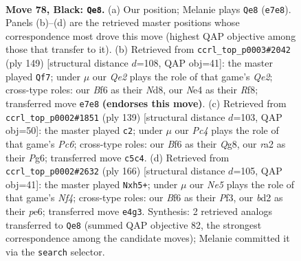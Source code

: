 \documentclass[11pt]{article}
\begin{document}
\clearpage

\begin{figure}[p]\centering
\begin{subfigure}{0.46\textwidth}\centering
\resizebox{\linewidth}{!}{%
\newchessgame
\chessboard[
  setfen={1r6/4q1k1/5b2/P1pQ1p2/3pnPp1/4P3/R2B4/3NK3 b - - 0 78},
  showmover=false,
  pgfstyle=straightmove, color=movearrow, markmove={e7-e8}
]}
\caption{}
\end{subfigure}\hfill
\begin{subfigure}{0.46\textwidth}\centering
\resizebox{\linewidth}{!}{%
\newchessgame
\chessboard[
  setfen={3n1r1k/4q3/Qp1p3P/b2PpBp1/4P1N1/8/5PK1/7R b - - 18 75},
  showmover=false,
  pgfstyle=straightmove, color=movearrow, markmove={e7-f7}
]}
\caption{}
\end{subfigure}
\\[4pt]
\begin{subfigure}{0.46\textwidth}\centering
\resizebox{\linewidth}{!}{%
\newchessgame
\chessboard[
  setfen={6q1/7k/1p4pB/p1bbQ1Pp/P3pR1P/2p3K1/8/8 b - - 1 70},
  showmover=false,
  pgfstyle=straightmove, color=movearrow, markmove={c3-c2}
]}
\caption{}
\end{subfigure}\hfill
\begin{subfigure}{0.46\textwidth}\centering
\resizebox{\linewidth}{!}{%
\newchessgame
\chessboard[
  setfen={4r3/p2b1pk1/P2qp3/7p/2pP1N1P/2P2PP1/3Q2K1/8 w - - 0 84},
  showmover=false,
  pgfstyle=straightmove, color=movearrow, markmove={f4-h5}
]}
\caption{}
\end{subfigure}
\caption{\textbf{Move 78, Black: \texttt{Qe8}.} (a) Our position; Melanie plays \texttt{Qe8} (\texttt{e7e8}). Panels (b)--(d) are the retrieved master positions whose correspondence most drove this move (highest QAP objective among those that transfer to it). (b) Retrieved from \texttt{ccrl\_top\_p0003\#2042} (ply 149) [structural distance $d$=108, QAP obj=41]: the master played \texttt{Qf7}; under $\mu$ our \emph{Qe2} plays the role of that game's \emph{Qe2}; cross-type roles: our \emph{B}f6 as their \emph{N}d8, our \emph{N}e4 as their \emph{R}f8; transferred move \texttt{e7e8} \textbf{(endorses this move)}. (c) Retrieved from \texttt{ccrl\_top\_p0002\#1851} (ply 139) [structural distance $d$=103, QAP obj=50]: the master played \texttt{c2}; under $\mu$ our \emph{Pc4} plays the role of that game's \emph{Pc6}; cross-type roles: our \emph{B}f6 as their \emph{Q}g8, our \emph{r}a2 as their \emph{P}g6; transferred move \texttt{c5c4}. (d) Retrieved from \texttt{ccrl\_top\_p0002\#2632} (ply 166) [structural distance $d$=105, QAP obj=41]: the master played \texttt{Nxh5+}; under $\mu$ our \emph{Ne5} plays the role of that game's \emph{Nf4}; cross-type roles: our \emph{B}f6 as their \emph{P}f3, our \emph{b}d2 as their \emph{p}e6; transferred move \texttt{e4g3}. Synthesis: 2 retrieved analogs transferred to \texttt{Qe8} (summed QAP objective 82, the strongest correspondence among the candidate moves); Melanie committed it via the \texttt{search} selector.}
\label{fig:thought-m155}
\end{figure}
\end{document}
